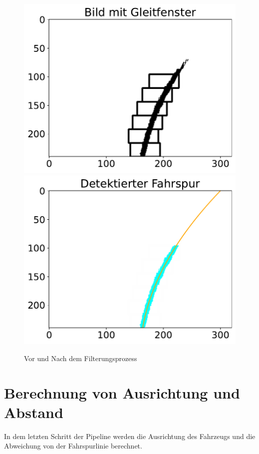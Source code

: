 \documentclass[arbeit=studie,oneside,BCOR=12mm]{ArbeitRST}
\begin{document}
\begin{figure}[h]
    \centering
    \includegraphics[scale=0.47]{before_filter}
    \includegraphics[scale=0.47]{after_filter}
    \caption{Vor und Nach dem Filterungsprozess}
    \label{gleit}
\end{figure}

\section{Berechnung von Ausrichtung und Abstand}

In dem letzten Schritt der Pipeline werden die Ausrichtung des Fahrzeugs und die Abweichung von
der Fahrspurlinie berechnet. 
\end{document}
